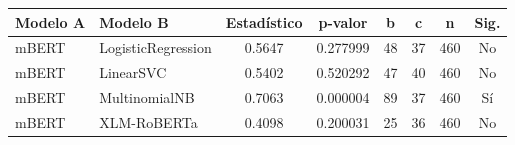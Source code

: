 \begin{tabular}{llcccccc}
\toprule
Modelo A & Modelo B & Estadístico & p-valor & b & c & n & Sig. \\
\midrule
mBERT & LogisticRegression & 0.5647 & 0.277999 & 48 & 37 & 460 & No \\
mBERT & LinearSVC & 0.5402 & 0.520292 & 47 & 40 & 460 & No \\
mBERT & MultinomialNB & 0.7063 & 0.000004 & 89 & 37 & 460 & Sí \\
mBERT & XLM-RoBERTa & 0.4098 & 0.200031 & 25 & 36 & 460 & No \\
\bottomrule
\end{tabular}
